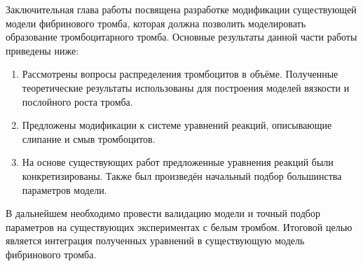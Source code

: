 Заключительная глава работы посвящена разработке модификации существующей модели фибринового тромба,
которая должна позволить моделировать образование тромбоцитарного тромба.
Основные результаты данной части работы приведены ниже:
\begin{enumerate}
    \item
        Рассмотрены вопросы распределения тромбоцитов в объёме.
        Полученные теоретические результаты использованы для построения моделей вязкости
        и послойного роста тромба.
    \item
        Предложены модификации к системе уравнений реакций,
        описывающие слипание и смыв тромбоцитов.
    \item
        На основе существующих работ предложенные уравнения реакций были конкретизированы.
        Также был произведён начальный подбор большинства параметров модели.
\end{enumerate}

В дальнейшем необходимо провести валидацию модели и точный подбор параметров на существующих экспериментах с белым тромбом.
Итоговой целью является интеграция полученных уравнений в существующую модель фибринового тромба.

